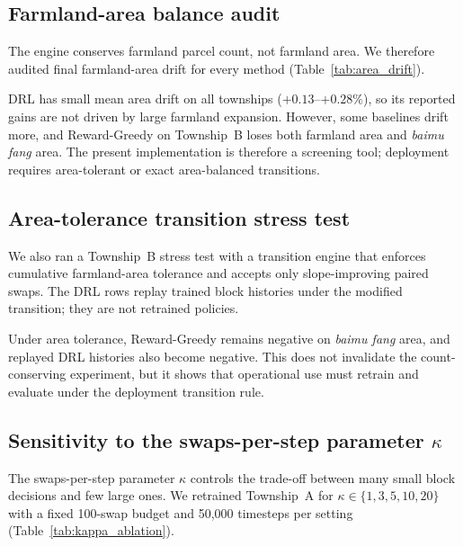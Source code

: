 \documentclass[preprint,12pt]{elsarticle}
\begin{document}
\subsection{Farmland-area balance audit}
\label{sec:area_drift}

The engine conserves farmland parcel count, not farmland area. We therefore audited final farmland-area drift for every method (Table~\ref{tab:area_drift}).



DRL has small mean area drift on all townships ($+0.13$--$+0.28\%$), so its reported gains are not driven by large farmland expansion. However, some baselines drift more, and Reward-Greedy on Township~B loses both farmland area and \textit{baimu fang} area. The present implementation is therefore a screening tool; deployment requires area-tolerant or exact area-balanced transitions.

\subsection{Area-tolerance transition stress test}
\label{sec:area_tolerance}

We also ran a Township~B stress test with a transition engine that enforces cumulative farmland-area tolerance and accepts only slope-improving paired swaps. The DRL rows replay trained block histories under the modified transition; they are not retrained policies.



Under area tolerance, Reward-Greedy remains negative on \textit{baimu fang} area, and replayed DRL histories also become negative. This does not invalidate the count-conserving experiment, but it shows that operational use must retrain and evaluate under the deployment transition rule.

\subsection{Sensitivity to the swaps-per-step parameter \texorpdfstring{$\kappa$}{kappa}}
\label{sec:kappa_ablation}

The swaps-per-step parameter $\kappa$ controls the trade-off between many small block decisions and few large ones. We retrained Township~A for $\kappa\in\{1,3,5,10,20\}$ with a fixed 100-swap budget and 50{,}000 timesteps per setting (Table~\ref{tab:kappa_ablation}).


\end{document}
